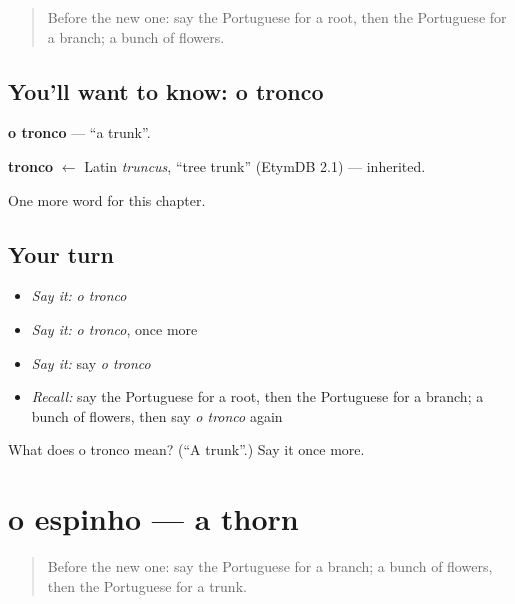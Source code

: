 \label{lesson:PT-C250-tronco}



\begin{quote}
Before the new one: say the Portuguese for a root, then the Portuguese for a branch; a bunch of flowers.
\end{quote}

\subsection*{You'll want to know: o tronco}
\textbf{o tronco} — \textquotedblleft{}a trunk\textquotedblright{}.

\begin{cousinweb}
\textbf{tronco} $\leftarrow$ Latin \emph{truncus}, \textquotedblleft{}tree trunk\textquotedblright{} (EtymDB 2.1) — inherited.
\end{cousinweb}

\begin{grammarlens}[title={What you've built}]
One more word for this chapter.
\end{grammarlens}

\subsection*{Your turn}
\begin{itemize}
\raggedright
  \item \emph{Say it:} \emph{o tronco}
  \item \emph{Say it:} \emph{o tronco}, once more
  \item \emph{Say it:} say \emph{o tronco}
  \item \emph{Recall:} say the Portuguese for a root, then the Portuguese for a branch; a bunch of flowers, then say \emph{o tronco} again
\end{itemize}

\begin{tcolorbox}[breakable,colback=teal!4,colframe=teal!35!black,title={Before you move on}]
What does o tronco mean? (\textquotedblleft{}A trunk\textquotedblright{}.) Say it once more.
\end{tcolorbox}
\section[o espinho]{o espinho — a thorn}

\label{lesson:PT-C250-espinho}



\begin{quote}
Before the new one: say the Portuguese for a branch; a bunch of flowers, then the Portuguese for a trunk.
\end{quote}

